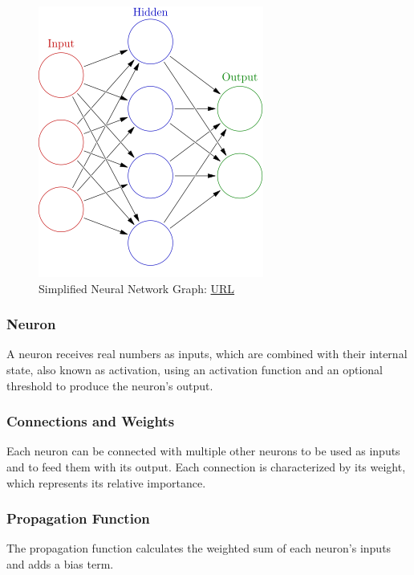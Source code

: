 \begin{figure} [H]
	\centering
	\includegraphics[scale=0.5]{Images/simplified-neural-network-graph.png}
	\decoRule
	\caption[Activation Function Graphs]{Simplified Neural Network Graph: \href{https://en.wikipedia.org/wiki/Artificial_neural_network}{URL}}
	\label{fig:simplified-neural-network-graph}
\end{figure}

\subsubsection{Neuron}
A neuron receives real numbers as inputs, which are combined with their internal state, also known as activation, using an activation function and an optional threshold to produce the neuron's output.

\subsubsection{Connections and Weights}
Each neuron can be connected with multiple other neurons to be used as inputs and to feed them with its output. Each connection is characterized by its weight, which represents its relative importance.

\subsubsection{Propagation Function}
The propagation function calculates the weighted sum of each neuron's inputs and adds a bias term.


